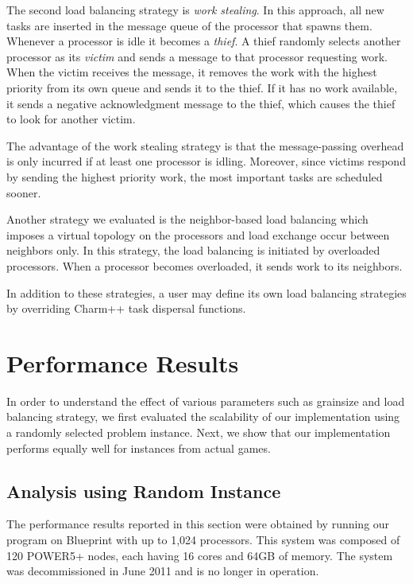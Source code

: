 \documentclass[10pt, conference, compsocconf]{IEEEtran}
\begin{document}
The second load balancing strategy is {\em work stealing}.  In this
approach, all new tasks are inserted in the message queue of the processor that
spawns them.  Whenever a processor is idle it becomes a {\em thief}.  A thief
randomly selects another processor as its {\em victim} and sends a message to
that processor requesting work.  When the victim receives the message, it
removes the work with the highest priority from its own queue and sends it to
the thief.  If it has no work available, it sends a negative acknowledgment
message to the thief, which causes the thief to look for another victim.

The advantage of the work stealing strategy is that the message-passing
overhead is only incurred if at least one processor is idling.  Moreover,
since victims respond by sending the highest priority work, the most
important tasks are scheduled sooner.  

Another strategy we evaluated is the neighbor-based load balancing which imposes a virtual topology on the processors and load exchange occur between neighbors only. In this strategy, the load balancing is initiated by overloaded processors. When a processor becomes overloaded, it sends work to its neighbors. 

In addition to these strategies, a user may define its own load balancing
strategies by overriding {\sc Charm++} task dispersal functions.


\section{Performance Results}\label{Results}
In order to understand the effect of various parameters such as grainsize and
load balancing strategy, we first evaluated the scalability of our
implementation using a randomly selected problem instance. Next, we show that
our implementation performs equally well for instances from actual games.

\subsection{Analysis using Random Instance} 

The performance results reported in this section were obtained by running our
program on Blueprint with up to 1,024 processors. This system was composed of
120 POWER5+ nodes, each having 16 cores and 64GB of memory. The system was
decommissioned in June 2011 and is no longer in operation.
\end{document}
